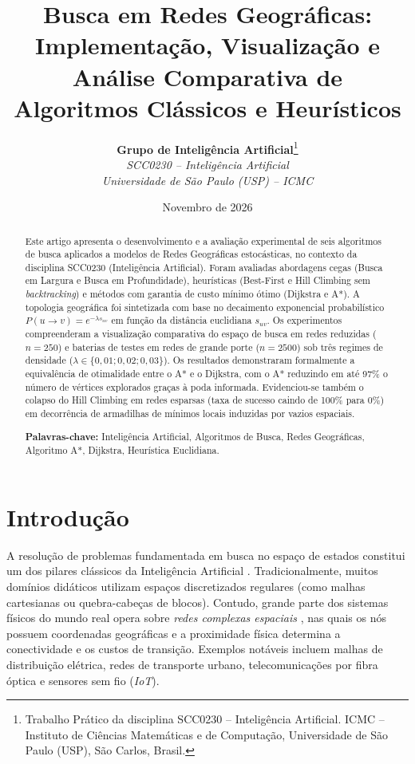 \documentclass[a4paper,10pt,twocolumn]{article}
\title{\textbf{\Large Busca em Redes Geográficas: Implementação, Visualização e Análise Comparativa de Algoritmos Clássicos e Heurísticos}}
\author{
    \textbf{Grupo de Inteligência Artificial}\thanks{Trabalho Prático da disciplina SCC0230 -- Inteligência Artificial. ICMC -- Instituto de Ciências Matemáticas e de Computação, Universidade de São Paulo (USP), São Carlos, Brasil.} \\
    \textit{SCC0230 -- Inteligência Artificial} \\
    \textit{Universidade de São Paulo (USP) -- ICMC}
}
\date{Novembro de 2026}
\begin{document}
\maketitle

\begin{abstract}
\noindent
Este artigo apresenta o desenvolvimento e a avaliação experimental de seis algoritmos de busca aplicados a modelos de Redes Geográficas estocásticas, no contexto da disciplina SCC0230 (Inteligência Artificial). Foram avaliadas abordagens cegas (Busca em Largura e Busca em Profundidade), heurísticas (Best-First e Hill Climbing sem \textit{backtracking}) e métodos com garantia de custo mínimo ótimo (Dijkstra e A*). A topologia geográfica foi sintetizada com base no decaimento exponencial probabilístico $P(u \to v) = e^{-\lambda s_{uv}}$ em função da distância euclidiana $s_{uv}$. Os experimentos compreenderam a visualização comparativa do espaço de busca em redes reduzidas ($n = 250$) e baterias de testes em redes de grande porte ($n = 2500$) sob três regimes de densidade ($\lambda \in \{0{,}01; 0{,}02; 0{,}03\}$). Os resultados demonstraram formalmente a equivalência de otimalidade entre o A* e o Dijkstra, com o A* reduzindo em até 97\% o número de vértices explorados graças à poda informada. Evidenciou-se também o colapso do Hill Climbing em redes esparsas (taxa de sucesso caindo de 100\% para 0\%) em decorrência de armadilhas de mínimos locais induzidas por vazios espaciais.
\vspace{1mm}

\noindent\textbf{Palavras-chave:} Inteligência Artificial, Algoritmos de Busca, Redes Geográficas, Algoritmo A*, Dijkstra, Heurística Euclidiana.
\end{abstract}

\section{Introdução}

A resolução de problemas fundamentada em busca no espaço de estados constitui um dos pilares clássicos da Inteligência Artificial \cite{russell2020}. Tradicionalmente, muitos domínios didáticos utilizam espaços discretizados regulares (como malhas cartesianas ou quebra-cabeças de blocos). Contudo, grande parte dos sistemas físicos do mundo real opera sobre \textit{redes complexas espaciais} \cite{barthelemy2011}, nas quais os nós possuem coordenadas geográficas e a proximidade física determina a conectividade e os custos de transição. Exemplos notáveis incluem malhas de distribuição elétrica, redes de transporte urbano, telecomunicações por fibra óptica e sensores sem fio (\textit{IoT}).
\end{document}
